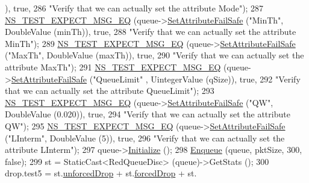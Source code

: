 \begin{DoxyCode}
      ), \textcolor{keyword}{true},
286                          \textcolor{stringliteral}{"Verify that we can actually set the attribute Mode"});
287   \hyperlink{group__testing_ga7304ba46a28d8cf08dfdfd6499cf7068}{NS\_TEST\_EXPECT\_MSG\_EQ} (queue->\hyperlink{classns3_1_1ObjectBase_aa7d333004e970f925a4ed5df275541b5}{SetAttributeFailSafe} (\textcolor{stringliteral}{"MinTh"}, 
      DoubleValue (minTh)), \textcolor{keyword}{true},
288                          \textcolor{stringliteral}{"Verify that we can actually set the attribute MinTh"});
289   \hyperlink{group__testing_ga7304ba46a28d8cf08dfdfd6499cf7068}{NS\_TEST\_EXPECT\_MSG\_EQ} (queue->\hyperlink{classns3_1_1ObjectBase_aa7d333004e970f925a4ed5df275541b5}{SetAttributeFailSafe} (\textcolor{stringliteral}{"MaxTh"}, 
      DoubleValue (maxTh)), \textcolor{keyword}{true},
290                          \textcolor{stringliteral}{"Verify that we can actually set the attribute MaxTh"});
291   \hyperlink{group__testing_ga7304ba46a28d8cf08dfdfd6499cf7068}{NS\_TEST\_EXPECT\_MSG\_EQ} (queue->\hyperlink{classns3_1_1ObjectBase_aa7d333004e970f925a4ed5df275541b5}{SetAttributeFailSafe} (\textcolor{stringliteral}{"QueueLimit"}
      , UintegerValue (qSize)), \textcolor{keyword}{true},
292                          \textcolor{stringliteral}{"Verify that we can actually set the attribute QueueLimit"});
293   \hyperlink{group__testing_ga7304ba46a28d8cf08dfdfd6499cf7068}{NS\_TEST\_EXPECT\_MSG\_EQ} (queue->\hyperlink{classns3_1_1ObjectBase_aa7d333004e970f925a4ed5df275541b5}{SetAttributeFailSafe} (\textcolor{stringliteral}{"QW"}, 
      DoubleValue (0.020)), \textcolor{keyword}{true},
294                          \textcolor{stringliteral}{"Verify that we can actually set the attribute QW"});
295   \hyperlink{group__testing_ga7304ba46a28d8cf08dfdfd6499cf7068}{NS\_TEST\_EXPECT\_MSG\_EQ} (queue->\hyperlink{classns3_1_1ObjectBase_aa7d333004e970f925a4ed5df275541b5}{SetAttributeFailSafe} (\textcolor{stringliteral}{"LInterm"}, 
      DoubleValue (5)), \textcolor{keyword}{true},
296                          \textcolor{stringliteral}{"Verify that we can actually set the attribute LInterm"});
297   queue->\hyperlink{classns3_1_1Object_af4411cb29971772fcd09203474a95078}{Initialize} ();
298   \hyperlink{classRedQueueDiscTestCase_a231b433374e4485d83bcca3088685e31}{Enqueue} (queue, pktSize, 300, \textcolor{keyword}{false});
299   st = StaticCast<RedQueueDisc> (queue)->GetStats ();
300   drop.test5 = st.\hyperlink{structns3_1_1RedQueueDisc_1_1Stats_a242027f6eb7d30e2cd636c52080e2c73}{unforcedDrop} + st.\hyperlink{structns3_1_1RedQueueDisc_1_1Stats_a56951fa215564c8d2e59aa046dc3e494}{forcedDrop} + st.

\end{DoxyCode}
